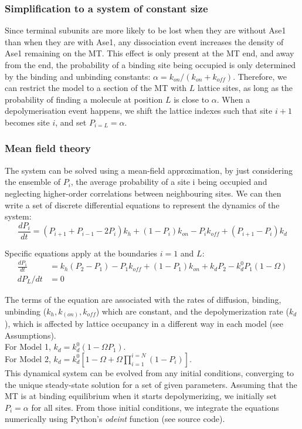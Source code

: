 \subsubsection{Simplification to a system of constant size}
Since terminal subunits are more likely to be lost when they are without Ase1 than when they are with Ase1, any dissociation event increases the density of Ase1 remaining on the MT. This effect is only present at the MT end, and away from the end, the probability of a binding site being occupied is only determined by the binding and unbinding constants: $\alpha=k_{on}/(k_{on}+k_{off})$.
Therefore, we can restrict the model to a section of the MT with $L$ lattice sites, as long as the probability of finding a molecule at position $L$ is close to $\alpha$. When a depolymerisation event happens, we shift the lattice indexes such that site $i+1$ becomes site $i$, and set $P_{i=L}= \alpha$. 

\subsubsection{Mean field theory}
The system can be solved using a mean-field approximation, by just considering the ensemble of  $P_i$, the average probability of a site i being occupied and neglecting higher-order correlations between neighbouring sites. We can then write a set of discrete differential equations to represent the dynamics of the system:
\begin{equation}
	\frac{dP_i}{dt}=(P_{i+1}+P_{i-1}-2P_i ) k_h+(1-P_i ) k_{on}-P_i k_{off}+(P_{i+1}-P_i ) k_d
\end{equation}

Specific equations apply at the boundaries $i=1$ and $L$:
\begin{align}
	\frac{dP_1}{dt} &= k_h (P_2-P_1 )-P_1 k_{off}+(1-P_1 ) k_{on}+k_d P_2-k_d^0 P_1 (1-\Omega) \\
	dP_L/dt &= 0
\end{align}

The terms of the equation are associated with the rates of diffusion, binding, unbinding ($k_h,k_(on ),k_{off}$) which are constant, and the depolymerization rate ($k_d$), which is affected by lattice occupancy in a different way in each model (see Assumptions).\\
For Model 1, $k_d=k_d^0 (1-\Omega P_1)$.\\
For Model 2, $k_d=k_d^0 [1-\Omega+\Omega\prod_{i=1}^{i=N}(1-P_i)]$.\\
This dynamical system can be evolved from any initial conditions, converging to the unique steady-state solution for a set of given parameters. Assuming that the MT is at binding equilibrium when it starts depolymerizing, we initially set $P_i=\alpha$ for all sites. From those initial conditions, we integrate the equations numerically using Python’s \textit{odeint} function (see source code).

